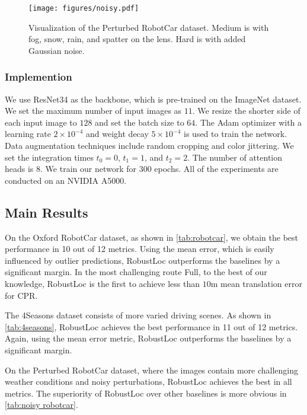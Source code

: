 \documentclass[letterpaper]{article} \usepackage{aaai23}  \usepackage{times}  \usepackage{helvet}  \usepackage{courier}  \usepackage[hyphens]{url}  \usepackage{graphicx} \urlstyle{rm} \def\UrlFont{\rm}  \usepackage{natbib}  \usepackage{caption} \frenchspacing  \setlength{\pdfpagewidth}{8.5in} \setlength{\pdfpageheight}{11in} \usepackage{booktabs}
\theoremstyle{remark}
\theoremstyle{plain}
\begin{document}
\begin{figure}[!t]
\begin{center}
\texttt{[image: figures/noisy.pdf]}
\end{center}
\caption{Visualization of the Perturbed RobotCar dataset. Medium is with fog, snow, rain, and spatter on the lens. Hard is with added Gaussian noise.}
\label{fig:noisy}
\end{figure}


\subsubsection{Implemention}
We use ResNet34 as the backbone, which is pre-trained on the ImageNet dataset. We set the maximum number of input images as $11$. We resize the shorter side of each input image to $128$ and set the batch size to $64$. The Adam optimizer with a learning rate $2\times10^{-4}$ and weight decay $5\times10^{-4}$ is used to train the network. Data augmentation techniques include random cropping and color jittering. We set the integration times $t_{0}=0$, $t_{1}=1$, and $t_{2}=2$. The number of attention heads is 8. We train our network for $300$ epochs. All of the experiments are conducted on an NVIDIA A5000. 



\subsection{Main Results}\label{subsec:main results}
On the Oxford RobotCar dataset, as shown in \cref{tab:robotcar}, we obtain the best performance in 10 out of 12 metrics. Using the mean error, which is easily influenced by outlier predictions, RobustLoc outperforms the baselines by a significant margin. In the most challenging route Full, to the best of our knowledge, RobustLoc is the first to achieve less than $10\mathrm{m}$ mean translation error for CPR.

The 4Seasons dataset consists of more varied driving scenes. As shown in \cref{tab:4seasons}, RobustLoc achieves the best performance in 11 out of 12 metrics. Again, using the mean error metric, RobustLoc outperforms the baselines by a significant margin.

On the Perturbed RobotCar dataset, where the images contain more challenging weather conditions and noisy perturbations, RobustLoc achieves the best in all metrics. The superiority of RobustLoc over other baselines is more obvious in \cref{tab:noisy robotcar}.
\end{document}
